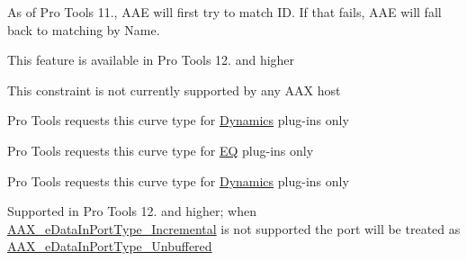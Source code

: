 \begin{DoxyRefList}
As of Pro Tools 11., A\+AE will first try to match ID. If that fails, A\+AE will fall back to matching by Name. 
\item[Module \mbox{\hyperlink{a00834}{A\+A\+X\+\_\+\+Digi\+Trace\+\_\+\+Guide}} ]\label{a00786__compatibility_notes000007}%
%
 This feature is available in Pro Tools 12. and higher 
\item[Member \mbox{\hyperlink{a00491_a0c5d795c1fd021c5b9b541febc34601aa12ffeaf435dc753cbd90adb409b739cd}{A\+A\+X\+\_\+e\+Constraint\+Location\+Mask\+\_\+\+Fixed\+Latency\+Domain}} ]\label{a00786__compatibility_notes000047}%
%
 This constraint is not currently supported by any A\+AX host  
\item[Member \mbox{\hyperlink{a00812_gga59c73d8f51c5c55d54a728eff39da884aed3949ae429e38e979f7d005759c579e}{A\+A\+X\+\_\+e\+Curve\+Type\+\_\+\+Dynamics}} ]\label{a00786__compatibility_notes000030}%
%
 Pro Tools requests this curve type for \mbox{\hyperlink{a00491_aef9637518fb1ac0e2f403444c73aba4aa1e8d5202983c58aa0346a9a547f55bd9}{Dynamics}} plug-\/ins only  
\item[Member \mbox{\hyperlink{a00812_gga59c73d8f51c5c55d54a728eff39da884a01b32d7031ceff45f7acad05dcddad19}{A\+A\+X\+\_\+e\+Curve\+Type\+\_\+\+EQ}} ]\label{a00786__compatibility_notes000029}%
%
 Pro Tools requests this curve type for \mbox{\hyperlink{a00491_aef9637518fb1ac0e2f403444c73aba4aad84edabff7d1d8732079b467c07dedcc}{EQ}} plug-\/ins only  
\item[Member \mbox{\hyperlink{a00812_gga59c73d8f51c5c55d54a728eff39da884a011b1b00d6189a8903735dcae2f8bc93}{A\+A\+X\+\_\+e\+Curve\+Type\+\_\+\+Reduction}} ]\label{a00786__compatibility_notes000031}%
%
 Pro Tools requests this curve type for \mbox{\hyperlink{a00491_aef9637518fb1ac0e2f403444c73aba4aa1e8d5202983c58aa0346a9a547f55bd9}{Dynamics}} plug-\/ins only  
\item[Member \mbox{\hyperlink{a00491_ab5677b173ad8647c24d34d28272d11fca4c356b21e878cfafca33ff61e1044b2e}{A\+A\+X\+\_\+e\+Data\+In\+Port\+Type\+\_\+\+Incremental}} ]\label{a00786__compatibility_notes000048}%
%
 Supported in Pro Tools 12. and higher; when \mbox{\hyperlink{a00491_ab5677b173ad8647c24d34d28272d11fca4c356b21e878cfafca33ff61e1044b2e}{A\+A\+X\+\_\+e\+Data\+In\+Port\+Type\+\_\+\+Incremental}} is not supported the port will be treated as \mbox{\hyperlink{a00491_ab5677b173ad8647c24d34d28272d11fca43dc59a68b369ee607f70700bfd02c2d}{A\+A\+X\+\_\+e\+Data\+In\+Port\+Type\+\_\+\+Unbuffered}}  

\end{DoxyRefList}
